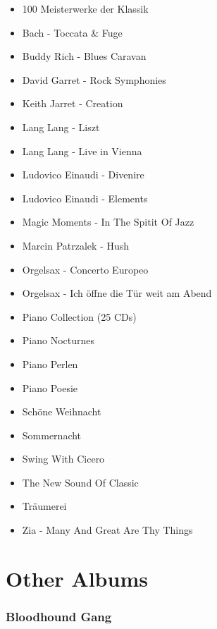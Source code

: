 \begin{itemize}
	\item 100 Meisterwerke der Klassik
	\item Bach - Toccata \& Fuge
	\item Buddy Rich - Blues Caravan
	\item David Garret - Rock Symphonies
	\item Keith Jarret - Creation
	\item Lang Lang - Liszt
	\item Lang Lang - Live in Vienna
	\item Ludovico Einaudi - Divenire
	\item Ludovico Einaudi - Elements
	\item Magic Moments - In The Spitit Of Jazz
	\item Marcin Patrzalek - Hush
	\item Orgelsax - Concerto Europeo
	\item Orgelsax - Ich öffne die Tür weit am Abend
	\item Piano Collection (25 CDs)
	\item Piano Nocturnes
	\item Piano Perlen
	\item Piano Poesie
	\item Schöne Weihnacht
	\item Sommernacht
	\item Swing With Cicero
	\item The New Sound Of Classic
	\item Träumerei
	\item Zia - Many And Great Are Thy Things
\end{itemize}

\section{Other Albums}

\subsubsection{Bloodhound Gang}

